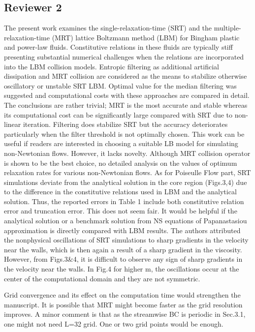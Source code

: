 \documentclass{article}
\begin{document}
	\subsection{Reviewer 2}
	  The present work examines the single-relaxation-time (SRT) and the multiple-relaxation-time (MRT) lattice Boltzmann method (LBM) for Bingham plastic and power-law fluids. Constitutive relations in these fluids are typically stiff presenting substantial numerical challenges when the relations are incorporated into the LBM collision models. Entropic filtering as additional artificial dissipation and MRT collision are considered as the means to stabilize otherwise oscillatory or unstable SRT LBM. Optimal value for the median filtering was suggested and computational costs with these approaches are compared in detail. The conclusions are rather trivial; MRT is the most accurate and stable whereas its computational cost can be significantly large compared with SRT due to non-linear iteration. Filtering does stabilize SRT but the accuracy deteriorates particularly when the filter threshold is not optimally chosen. This work can be useful if readers are interested in choosing a suitable LB model for simulating non-Newtonian flows. However, it lacks novelty. Although MRT collision operator is shown to be the best choice, no detailed analysis on the values of optimum relaxation rates for various non-Newtonian flows.
	As for Poiseulle Flow part, SRT simulations deviate from the analytical solution in the core region (Figs.3,4) due to the difference in the constitutive relations used in LBM and the analytical solution. Thus, the reported errors in Table 1 include both constitutive relation error and truncation error. This does not seem fair. It would be helpful if the analytical solution or a benchmark solution from NS equations of Papanastasiou approximation is directly compared with LBM results. The authors attributed the nonphysical oscillations of SRT simulations to sharp gradients in the velocity near the walls, which is then again a result of a sharp gradient in the viscosity. However, from Figs.3&4, it is difficult to observe any sign of sharp gradients in the velocity near the walls. In Fig.4 for higher m, the oscillations occur at the center of the computational domain and they are not symmetric.
	
	Grid convergence and its effect on the computation time would strengthen the manuscript. It is possible that MRT might become faster as the grid resolution improves. A minor comment is that as the streamwise BC is periodic in Sec.3.1, one might not need L=32 grid. One or two grid points would be enough.
\end{document}
